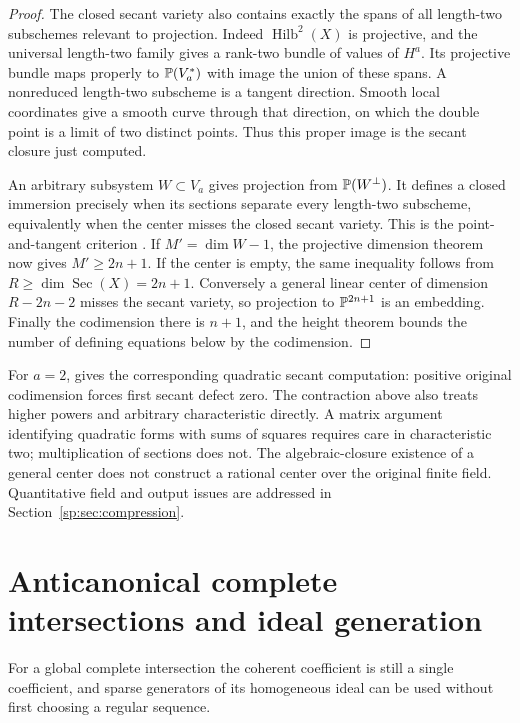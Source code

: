 \begin{proof}
The closed secant variety also contains exactly the spans of all
length-two subschemes relevant to projection. Indeed
$\operatorname{Hilb}^2(X)$ is projective, and the universal length-two
family gives a rank-two bundle of values of $H^a$. Its projective bundle
maps properly to $\mathbb P(V_a^*)$ with image the union of these spans.
A nonreduced length-two subscheme is a tangent direction. Smooth local
coordinates give a smooth curve through that direction, on which the
double point is a limit of two distinct points. Thus this proper image
is the secant closure just computed.

An arbitrary subsystem $W\subset V_a$ gives projection from
$\mathbb P(W^\perp)$. It defines a closed immersion precisely when its sections
separate every length-two subscheme, equivalently when the center misses
the closed secant variety. This is the point-and-tangent criterion
\citep[Lemmas~33.23.1--2, tag~0E8R]{sp-stacks}.
If $M'=\dim W-1$, the projective dimension theorem now gives
$M'\geq2n+1$. If the center is empty, the same inequality follows from
$R\geq\dim\operatorname{Sec}(X)=2n+1$. Conversely a general linear
center of dimension $R-2n-2$ misses the secant variety, so projection
to $\mathbb P^{2n+1}$ is an embedding. Finally the codimension there is
$n+1$, and the height theorem bounds the number of defining equations
below by the codimension.
\end{proof}

For $a=2$, \citet[Proposition~1.3(a), Theorem~3.3, and Example~6.6]{sp-zak}
gives the corresponding quadratic secant computation: positive original
codimension forces first secant defect zero. The contraction above
also treats higher powers and arbitrary characteristic directly.
A matrix argument identifying quadratic forms with sums of squares
requires care in characteristic two; multiplication of sections does
not. The algebraic-closure existence of a general center does not
construct a rational center over the original finite field. Quantitative
field and output issues are addressed in Section~\ref{sp:sec:compression}.

\section{Anticanonical complete intersections and ideal generation}
\label{sp:sec:ideal}
For a global complete intersection the coherent coefficient is still a
single coefficient, and sparse generators of its homogeneous ideal can
be used without first choosing a regular sequence.

